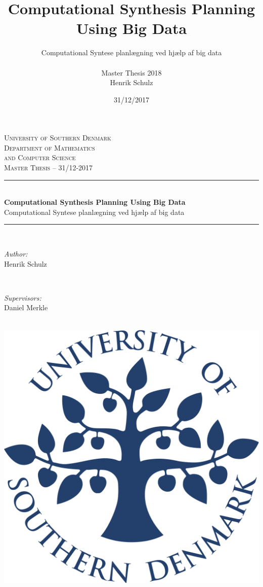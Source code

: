 \documentclass[a4paper,10pt,titlepage]{paper}
\title{Computational Synthesis Planning Using Big Data}
\author{Computational Syntese planlægning ved hjælp af big data\\ \\Master Thesis 2018\\Henrik Schulz}
\date{31/12/2017}
\begin{document}
\begin{titlepage}

\newcommand{\HRule}{\rule{\linewidth}{0.5mm}} %

\center %

\textsc{\LARGE University of Southern Denmark\\\vspace{0.2cm}Department of Mathematics \\ \vspace{0.2 cm} and Computer Science}\\[1.5cm] %
\textsc{\large Master Thesis -- 31/12-2017}\\[0.5cm] %

\HRule \\[0.4cm]
{\huge \bfseries Computational Synthesis Planning Using Big Data}\\[0.4cm] 
{Computational Syntese planlægning ved hjælp af big data}
\HRule \\[1.5cm]

\begin{minipage}{0.3\textwidth}
\begin{flushleft} \large
\emph{Author:}\\
Henrik Schulz\\

\end{flushleft}
\end{minipage}
~
\begin{minipage}{0.4\textwidth}
\begin{flushright} \large
\emph{Supervisors:} \\
Daniel Merkle
\end{flushright}
\end{minipage}\\[4cm]
\includegraphics[scale=0.3]{Billeder/logo.png}
\vfill %


\end{titlepage}
\end{document}
